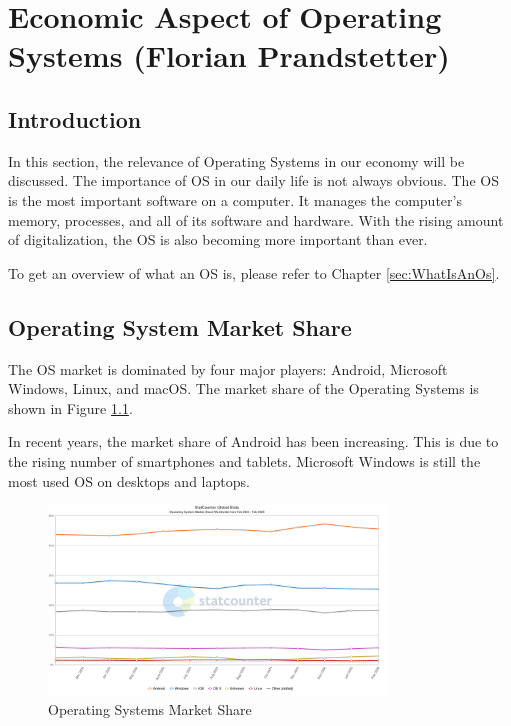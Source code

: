 \chapter{Economic Aspect of Operating Systems (Florian Prandstetter)}
\label{chap:Economic_aspect_of_Operating_Systems}

\section{Introduction}

In this section, the relevance of Operating Systems in our economy will be discussed. The importance of OS in our daily life is not always obvious.
The OS is the most important software on a computer. It manages the computer's memory, processes, and all of its software and hardware. 
With the rising amount of digitalization, the OS is also becoming more important than ever.

To get an overview of what an OS is, please refer to Chapter \ref{sec:WhatIsAnOs}.

\section{Operating System Market Share}

The OS market is dominated by four major players: Android, Microsoft Windows, Linux, and macOS.
The market share of the Operating Systems is shown in Figure \ref{fig:Operating_Systems_Market_Share}. 

In recent years, the market share of Android has been increasing. This is due to the rising number of smartphones and tablets.
Microsoft Windows is still the most used OS on desktops and laptops.

\begin{figure}[H]
    \centering
    \includegraphics[width=0.8\textwidth]{figures/StatCounter-os_combined-ww-monthly-202402-202502.png}
    \caption{Operating Systems Market Share}
    \label{fig:Operating_Systems_Market_Share}
\end{figure}
\cite{OsMarketShare2}

